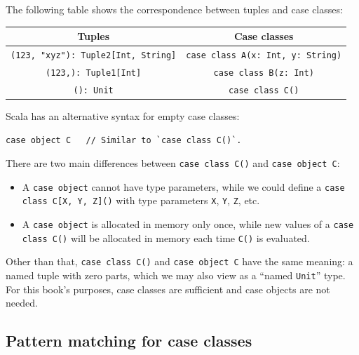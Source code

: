 The following table shows the correspondence between tuples and case
classes:
\begin{center}
\begin{tabular}{|c|c|}
\hline 
\textbf{\small{}Tuples} & \textbf{\small{}Case classes}\tabularnewline
\hline 
\hline 
{\small{}}\lstinline!(123, "xyz"): Tuple2[Int, String]! & {\small{}}\lstinline!case class A(x: Int, y: String)!\tabularnewline
\hline 
{\small{}}\lstinline!(123,): Tuple1[Int]! & {\small{}}\lstinline!case class B(z: Int)!\tabularnewline
\hline 
{\small{}}\lstinline!(): Unit! & {\small{}}\lstinline!case class C()!\tabularnewline
\hline 
\end{tabular}
\par\end{center}

Scala has an alternative syntax for empty case classes:
\begin{lstlisting}
case object C   // Similar to `case class C()`.
\end{lstlisting}
There are two main differences between \lstinline!case class C()!
and \lstinline!case object C!:
\begin{itemize}
\item A \lstinline!case object! cannot have type parameters, while we could
define a \lstinline!case class C[X, Y, Z]()! with type parameters
\lstinline!X!, \lstinline!Y!, \lstinline!Z!, etc.
\item A \lstinline!case object! is allocated in memory only once, while
new values of a \lstinline!case class C()! will be allocated in memory
each time \lstinline!C()! is evaluated.
\end{itemize}
Other than that, \lstinline!case class C()! and \lstinline!case object C!
have the same meaning: a named tuple with zero parts, which we may
also view as a \textsf{``}named \lstinline!Unit!\textsf{''}
type. For this book\textsf{'}s purposes, case classes are sufficient and case
objects are not needed.

\subsection{Pattern matching for case classes}

